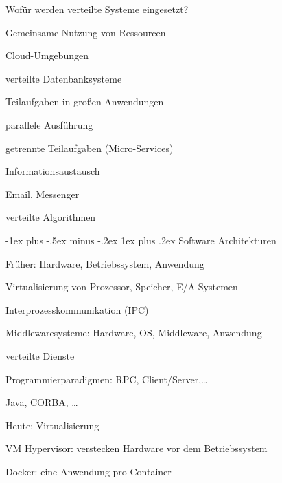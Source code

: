 \documentclass[10pt]{article}
\makeatletter
\renewcommand{\subsubsection}{\@startsection{subsubsection}{3}{0mm}%
                                {-1ex plus -.5ex minus -.2ex}%
                                {1ex plus .2ex}%
                                {\normalfont\small\bfseries}}
\makeatother
\begin{document}
Wofür werden verteilte Systeme eingesetzt? 
\begin{itemize*}
  \item Gemeinsame Nutzung von Ressourcen
  \begin{itemize*}
    \item Cloud-Umgebungen
    \item verteilte Datenbanksysteme
  \end{itemize*}
  \item Teilaufgaben in großen Anwendungen
  \begin{itemize*}
    \item parallele Ausführung
    \item getrennte Teilaufgaben (Micro-Services)
  \end{itemize*}
  \item Informationsaustausch
  \begin{itemize*}
    \item Email, Messenger
    \item verteilte Algorithmen
  \end{itemize*}
\end{itemize*}

\subsubsection{Software Architekturen}
\begin{enumerate*}
  \item Früher: Hardware, Betriebssystem, Anwendung
  \begin{itemize*}
    \item Virtualisierung von Prozessor, Speicher, E/A Systemen
    \item Interprozesskommunikation (IPC)
  \end{itemize*}
  \item Middlewaresysteme: Hardware, OS, Middleware, Anwendung
  \begin{itemize*}
    \item verteilte Dienste
    \item Programmierparadigmen: RPC, Client/Server,…
    \item Java, CORBA, …
  \end{itemize*}
  \item Heute: Virtualisierung
  \begin{itemize*}
    \item VM Hypervisor: verstecken Hardware vor dem Betriebssystem
    \item Docker: eine Anwendung pro Container
  \end{itemize*}
\end{enumerate*}
\end{document}
